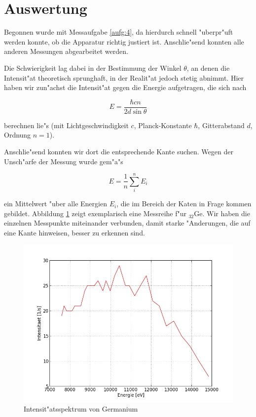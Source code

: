 \section{Auswertung}
	\label{sec:auswertung}
	
	Begonnen wurde mit Messaufgabe \ref{aufg:4}, da hierdurch schnell "uberpr"uft werden konnte, ob die Apparatur richtig justiert ist.
	Anschlie"send konnten alle anderen Messungen abgearbeitet werden.

	Die Schwierigkeit lag dabei in der Bestimmung der Winkel $\theta$, an denen die Intensit"at theoretisch sprunghaft, in der Realit"at jedoch stetig abnimmt.
	Hier haben wir zun"achst die Intensit"at gegen die Energie aufgetragen, die sich nach 

	\begin{equation}
		E = \frac{\hbar c n}{2 d \sin{\theta}}
		\label{eqn:energie}
	\end{equation}

	berechnen lie"s (mit Lichtgeschwindigkeit $c$, Planck-Konstante $\hbar$, Gitterabstand $d$, Ord\-nung $n = 1$).

	Anschlie"send konnten wir dort die entsprechende Kante suchen.
	Wegen der Unsch"arfe der Messung wurde gem"a"s

	\begin{equation}
		E = \frac{1}{n} \sum_i^n E_i \nonumber
	\end{equation}

	ein Mittelwert "uber alle Energien $E_i$, die im Bereich der Katen in Frage kommen gebildet.
	Abbildung \ref{fig:germanium} zeigt exemplarisch eine Messreihe f"ur ${}_{32}^{}\mathrm{Ge}$.
	Wir haben die einzelnen Mess\-pun\-kte miteinander verbunden, damit starke "Anderungen, die auf eine Kante hinweisen, besser zu erkennen sind.

	\begin{figure}[h!]
		\centering
		\includegraphics[width = 13cm]{img/graph_32_fein.png}
		\caption{Intensit"atsspektrum von Germanium}
		\label{fig:germanium}
	\end{figure}

